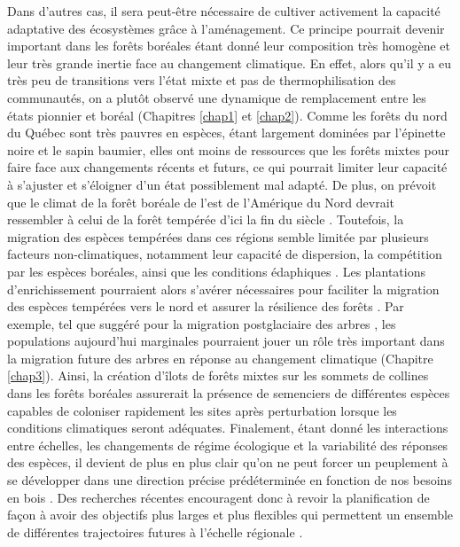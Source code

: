 Dans d'autres cas, il sera peut-être nécessaire de cultiver activement
la capacité adaptative des écosystèmes grâce à l'aménagement. Ce
principe pourrait devenir important dans les forêts boréales étant donné
leur composition très homogène et leur très grande inertie face au
changement climatique. En effet, alors qu'il y a eu très peu de
transitions vers l'état mixte et pas de thermophilisation des
communautés, on a plutôt observé une dynamique de remplacement entre les
états pionnier et boréal (Chapitres \ref{chap1} et \ref{chap2}). Comme
les forêts du nord du Québec sont très pauvres en espèces, étant
largement dominées par l'épinette noire et le sapin baumier, elles ont
moins de ressources que les forêts mixtes pour faire face aux
changements récents et futurs, ce qui pourrait limiter leur capacité à
s'ajuster et s'éloigner d'un état possiblement mal adapté. De plus, on
prévoit que le climat de la forêt boréale de l'est de l'Amérique du Nord
devrait ressembler à celui de la forêt tempérée d'ici la fin du siècle
\citep{gauthier_boreal_2015}. Toutefois, la migration des espèces
tempérées dans ces régions semble limitée par plusieurs facteurs
non-climatiques, notamment leur capacité de dispersion, la compétition
par les espèces boréales, ainsi que les conditions édaphiques
\citep[Chapitre
\ref{chap3};][]{solarik_priority_2019, carteron_soil_2020}. Les
plantations d'enrichissement pourraient alors s'avérer nécessaires pour
faciliter la migration des espèces tempérées vers le nord et assurer la
résilience des forêts \citep{duveneck_measuring_2016}. Par exemple, tel
que suggéré pour la migration postglaciaire des arbres
\citep{mclachlan_molecular_2005}, les populations aujourd'hui marginales
pourraient jouer un rôle très important dans la migration future des
arbres en réponse au changement climatique (Chapitre \ref{chap3}).
Ainsi, la création d'îlots de forêts mixtes sur les sommets de collines
dans les forêts boréales assurerait la présence de semenciers de
différentes espèces capables de coloniser rapidement les sites après
perturbation lorsque les conditions climatiques seront adéquates.
Finalement, étant donné les interactions entre échelles, les changements
de régime écologique et la variabilité des réponses des espèces, il
devient de plus en plus clair qu'on ne peut forcer un peuplement à se
développer dans une direction précise prédéterminée en fonction de nos
besoins en bois \citep{puettmann_critique_2009}. Des recherches récentes
encouragent donc à revoir la planification de façon à avoir des
objectifs plus larges et plus flexibles qui permettent un ensemble de
différentes trajectoires futures à l'échelle régionale
\citep{messier_dealing_2016, puettmann_critique_2009}.

